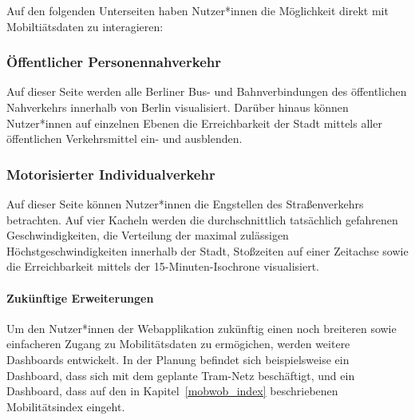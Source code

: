 Auf den folgenden Unterseiten haben Nutzer*innen die Möglichkeit direkt mit Mobiltiätsdaten zu interagieren:

\subsubsection{Öffentlicher Personennahverkehr}

Auf dieser Seite werden alle Berliner Bus- und Bahnverbindungen des öffentlichen Nahverkehrs innerhalb von Berlin visualisiert. Darüber hinaus können Nutzer*innen auf einzelnen Ebenen die Erreichbarkeit der Stadt mittels aller öffentlichen Verkehrsmittel ein- und ausblenden.


\subsubsection{Motorisierter Individualverkehr}

Auf dieser Seite können Nutzer*innen die Engstellen des Straßenverkehrs betrachten. Auf vier Kacheln werden die durchschnittlich tatsächlich gefahrenen Geschwindigkeiten, die Verteilung der maximal zulässigen Höchstgeschwindigkeiten innerhalb der Stadt, Stoßzeiten auf einer Zeitachse sowie die Erreichbarkeit mittels der 15-Minuten-Isochrone visualisiert.

\paragraph{Zukünftige Erweiterungen}

Um den Nutzer*innen der Webapplikation zukünftig einen noch breiteren sowie einfacheren Zugang zu Mobilitätsdaten zu ermögichen, werden weitere Dashboards entwickelt. In der Planung befindet sich beispielsweise ein Dashboard, dass sich mit dem geplante Tram-Netz beschäftigt, und ein Dashboard, dass auf den in Kapitel~\ref{mobwob_index} beschriebenen Mobilitätsindex eingeht.
